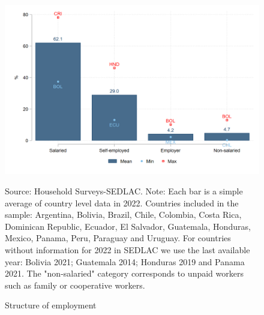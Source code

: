 \documentclass[english]{article}
\begin{document}
\begin{itemize}
            \begin{figure}[H]
                \justifying
                \caption{Structure of employment}     
                \centerline{\includegraphics[scale=.3]{latex/figures/Snapshot/Structure of employment.png}
                \label{fig:employment}}
                \footnotesize{Source: Household Surveys-SEDLAC.}
                \footnotesize{Note: Each bar is a simple average of country level data in 2022. Countries included in the sample: Argentina, Bolivia, Brazil, Chile, Colombia, Costa Rica, Dominican Republic, Ecuador, El Salvador, Guatemala, Honduras, Mexico, Panama, Peru, Paraguay and Uruguay. For countries without information for 2022 in SEDLAC we use the last available year: Bolivia 2021; Guatemala 2014; Honduras 2019 and Panama 2021. The "non-salaried" category corresponds to unpaid workers such as family or cooperative workers.}
            \end{figure}
    

\end{itemize}
\end{document}
